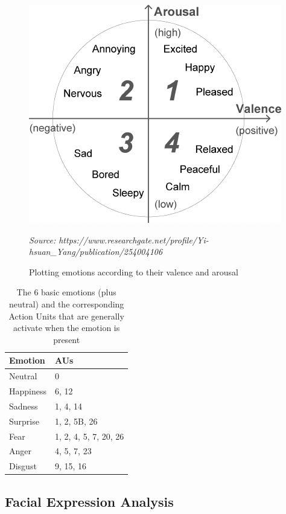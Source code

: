 \documentclass[12pt,twoside]{article}
\newcommand{\source}[1]{\vspace{-3pt} \caption*{ \footnotesize{\textit{Source: {#1}}}} }
\begin{document}
\begin{figure}[h]
\centering
\includegraphics[scale=0.6]{./figures/valence_arousal_plot.png}
\caption{Plotting emotions according to their valence and arousal}
\source{https://www.researchgate.net/profile/Yi-hsuan\_Yang/publication/254004106}
\label{fig:arval}
\end{figure}

\begin{table}[h]
\centering
\begin{tabular}{|l|l|}
 \hline
 Emotion & AUs\\
 \hline
 \hline
 Neutral   & 0                     \\
 \hline
 Happiness & 6, 12                 \\
 \hline
 Sadness   & 1, 4, 14              \\
 \hline
 Surprise  & 1, 2, 5B, 26          \\
 \hline
 Fear      & 1, 2, 4, 5, 7, 20, 26 \\
 \hline
 Anger     & 4, 5, 7, 23           \\
 \hline
 Disgust   & 9, 15, 16             \\
 \hline
\end{tabular}
\caption{The 6 basic emotions (plus neutral) and the corresponding Action Units that are generally activate when the emotion is present}
\label{tab:emo-au}
\end{table}

\subsection{Facial Expression Analysis}
\end{document}
